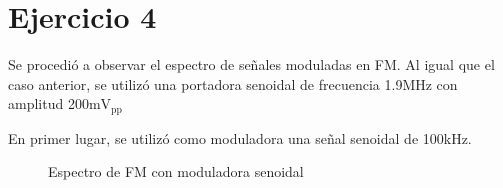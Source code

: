 \documentclass[../../labo_tp5_main.tex]{subfiles}
\begin{document}
\section{Ejercicio 4}

Se procedi\'o a observar el espectro de se\~nales moduladas en FM. Al igual que el caso anterior, se utiliz\'o una portadora senoidal de frecuencia 1.9MHz con amplitud 200m$\mathrm{V}_{\mathrm{pp}}$

En primer lugar, se utiliz\'o como moduladora una se\~nal senoidal de 100kHz.

\begin{figure}[H]
	\centering
	\caption{Espectro de FM con moduladora senoidal}
\end{figure}
\end{document}
